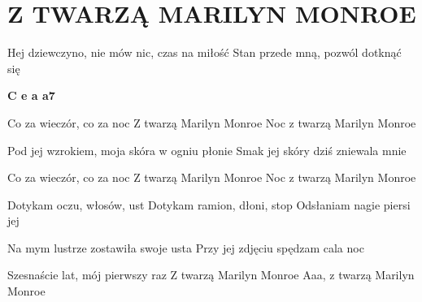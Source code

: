 \documentclass[../../../songbook.tex]{subfiles}
\begin{document}
\TabPositions{8cm} %
\section*{Z TWARZĄ MARILYN MONROE}
{}
\vspace{0.5cm}
Hej dziewczyno, nie mów nic, czas na miłość 	 \newline
Stan przede mną, pozwól dotknąć się 			 \newline

{\color{red}\textbf{C e a a7} } \newline
	
\-\hspace{1cm} Co za wieczór, co za noc 	 \newline
\-\hspace{1cm} Z twarzą Marilyn Monroe		 \newline
\-\hspace{1cm} Noc z twarzą Marilyn Monroe	 \newline

Pod jej wzrokiem, moja skóra w ogniu płonie \newline
Smak jej skóry dziś zniewala mnie \newline

\-\hspace{1cm} Co za wieczór, co za noc 		  \newline	
\-\hspace{1cm} Z twarzą Marilyn Monroe			  \newline	
\-\hspace{1cm} Noc z twarzą Marilyn Monroe		 \newline

Dotykam oczu, włosów, ust 		 \newline
Dotykam ramion, dłoni, stop 	 \newline
Odsłaniam nagie piersi jej  	 \newline

Na mym lustrze zostawiła swoje usta \newline
Przy jej zdjęciu spędzam cala noc \newline

\-\hspace{1cm} Szesnaście lat, mój pierwszy raz \newline
\-\hspace{1cm} Z twarzą Marilyn Monroe \newline
\-\hspace{1cm} Aaa, z twarzą Marilyn Monroe \newline
\end{document}
